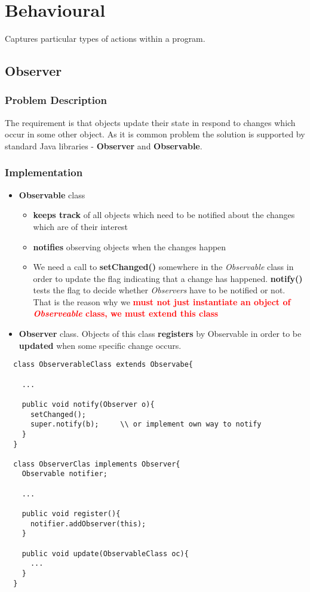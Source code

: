 \documentclass{report}
\begin{document}
\chapter{Behavioural}
Captures particular types of actions within a program.


\section{Observer}

\subsection{Problem Description}
The requirement is that objects update their state in respond to changes which occur in some other object. As it is common problem
the solution is supported by standard Java libraries - \textbf{Observer} and \textbf{Observable}.

\subsection{Implementation}
\begin{itemize}
	\item \textbf{Observable} class 
	\begin{itemize}
		\item \textbf{keeps track} of all objects which need to be notified about the changes which are of their interest
		\item \textbf{notifies} observing objects when the changes happen
		\item We need a call to \textbf{setChanged()} somewhere in the \textit{Observable} class in order to update the flag indicating that a change has happened.
		\textbf{notify()} tests the flag to decide whether \textit{Observers} have to be notified or not. That is the reason why we \textbf{\textcolor{red}{must not just instantiate an object of \textit{Observeable} class, we must extend this class}}
	\end{itemize}

	\item \textbf{Observer} class. Objects of this class \textbf{registers} by Observable in order to be \textbf{updated}
	when some specific change occurs.
\end{itemize}

\begin{verbatim}
  class ObserverableClass extends Observabe{
    
    ...
    
    public void notify(Observer o){
      setChanged();
      super.notify(b);     \\ or implement own way to notify
    }
  }
  
  class ObserverClas implements Observer{
    Observable notifier;
    
    ...
    
    public void register(){
      notifier.addObserver(this);
    }
    
    public void update(ObservableClass oc){
      ...
    }
  }
\end{verbatim}
\end{document}
